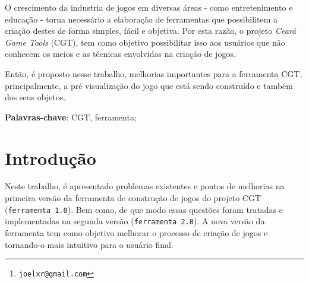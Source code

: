\documentclass[12pt,twoside,openright,a4paper,english,brazil,sumario=tradicional]{abntex2}
\author{Joel Xavier Rocha\thanks{\texttt{joelxr@gmail.com}}}
\begin{document}
\lstset{
        frame=single,
        showlines=true,
        language=java,
        tabsize=3,
        basicstyle=\scriptsize
        }
\frenchspacing
\imprimircapa
\imprimirfolhaderosto*

%     

% 

\begin{agradecimentos}

\end{agradecimentos}
\setlength{\absparsep}{18pt}
\begin{resumo}
   O crescimento da industria de jogos em diversas áreas - como entretenimento e educação - torna necessário a elaboração de ferramentas que possibilitem a criação destes de forma simples, fácil e objetiva. Por esta razão, o projeto \emph{Ceará Game Tools} (CGT), tem como objetivo possibilitar isso aos usuários que não conhecem os meios e as técnicas envolvidas na criação de jogos.

   Então, é proposto nesse trabalho, melhorias importantes para a ferramenta CGT, principalmente, a pré visualização do jogo que está sendo construído e também dos seus objetos.

   \vspace{\onelineskip}
   \noindent
   \textbf{Palavras-chave}: CGT, ferramenta;
\end{resumo}
\listoffigures*
\cleardoublepage
{}
\listoftables*
\cleardoublepage
{}
\tableofcontents*
\cleardoublepage
\textual
\chapter{Introdução} %
\label{chap:introducao}
Neste trabalho, é apresentado problemas existentes e pontos de melhorias na primeira versão da ferramenta de construção de jogos do projeto CGT (\texttt{ferramenta 1.0}). Bem como, de que modo essas questões foram tratadas e implementadas na segunda versão (\texttt{ferramenta 2.0}). A nova versão da ferramenta tem como objetivo melhorar o processo de criação de jogos e tornando-o mais intuitivo para o usuário final.
\end{document}
